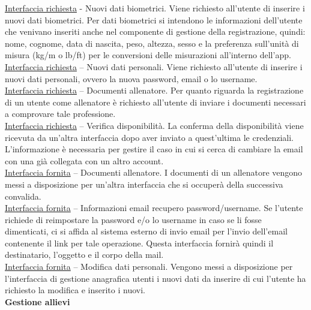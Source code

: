 \documentclass{article}
\begin{document}
      \underline{Interfaccia richiesta} - Nuovi dati biometrici. Viene richiesto all’utente di inserire i nuovi dati biometrici. Per dati biometrici si intendono le informazioni
      dell’utente che venivano inseriti anche nel componente di gestione della registrazione, quindi: nome, cognome, data di nascita, peso, altezza, sesso e la preferenza sull'unità di
      misura (kg/m o lb/ft) per le conversioni delle misurazioni all'interno dell'app.\\

      \underline{Interfaccia richiesta} – Nuovi dati personali. Viene richiesto all’utente di inserire i nuovi dati personali, ovvero la nuova password, email o lo username.\\

      \underline{Interfaccia richiesta} – Documenti allenatore. Per quanto riguarda la registrazione di un utente come allenatore è richiesto all'utente di inviare i documenti necessari
      a comprovare tale professione.\\

      \underline{Interfaccia richiesta} – Verifica disponibilità. La conferma della disponibilità viene ricevuta da un’altra interfaccia dopo aver inviato a quest’ultima le credenziali.
      L’informazione è necessaria per gestire il caso in cui si cerca di cambiare la email con una già collegata con un altro account.\\

      \underline{Interfaccia fornita} – Documenti allenatore. I documenti di un allenatore vengono messi a disposizione per un'altra interfaccia che si occuperà della successiva
      convalida.\\

      \underline{Interfaccia fornita} – Informazioni email recupero password/username. Se l’utente richiede di reimpostare la password e/o lo username in caso se li fosse dimenticati,
      ci si affida al sistema esterno di invio email per l’invio dell'email contenente il link per tale operazione. Questa interfaccia fornirà quindi il destinatario, l’oggetto e il
      corpo della mail.\\

      \underline{Interfaccia fornita} – Modifica dati personali. Vengono messi a disposizione per l’interfaccia di gestione anagrafica utenti i nuovi dati da inserire di cui l’utente
      ha richiesto la modifica e inserito i nuovi.\\


      {\Large\textbf{Gestione allievi}}\\
\end{document}
